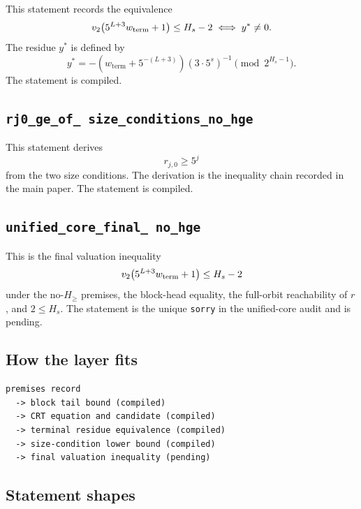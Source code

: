 This statement records the equivalence
\begin{equation*}
  v_2\!\left(5^{L+3}w_{\mathrm{term}}+1\right)\le H_s-2
  \iff y^*\ne0.
\end{equation*}
The residue $y^*$ is defined by
\begin{equation*}
  y^*=
  -\left(w_{\mathrm{term}}+5^{-(L+3)}\right)
  \left(3\cdot5^s\right)^{-1}
  \pmod{2^{H_s-1}}.
\end{equation*}
The statement is compiled.

\subsection{\texttt{rj0\_\allowbreak ge\_\allowbreak of\_\allowbreak
size\_\allowbreak conditions\_\allowbreak no\_\allowbreak hge}}

This statement derives
\begin{equation*}
  r_{j,0}\ge5^j
\end{equation*}
from the two size conditions.  The derivation is the inequality chain
recorded in the main paper.  The statement is compiled.

\subsection{\texttt{unified\_\allowbreak core\_\allowbreak final\_\allowbreak
no\_\allowbreak hge}}

This is the final valuation inequality
\begin{equation*}
  v_2\!\left(5^{L+3}w_{\mathrm{term}}+1\right)\le H_s-2
\end{equation*}
under the no-$H_{\ge}$ premises, the block-head equality, the
full-orbit reachability of $r$, and $2\le H_s$.  The statement is
the unique \texttt{sorry} in the unified-core audit and is pending.

\subsection{How the layer fits}

\begin{verbatim}
premises record
  -> block tail bound (compiled)
  -> CRT equation and candidate (compiled)
  -> terminal residue equivalence (compiled)
  -> size-condition lower bound (compiled)
  -> final valuation inequality (pending)
\end{verbatim}

\subsection{Statement shapes}

